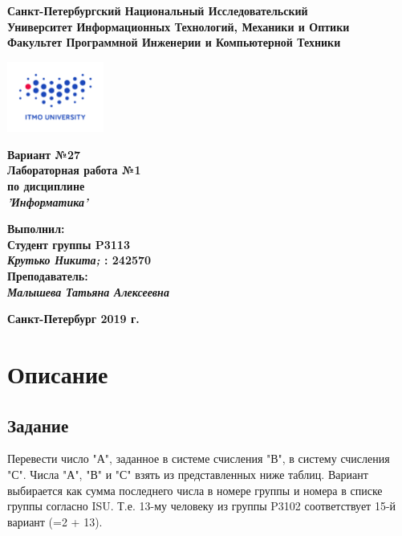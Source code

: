 \documentclass[11pt]{article}
\author{Krutko Nikita / KrutNA}
\date{\today}
\title{}
\begin{document}
\large
\thispagestyle{empty}
\begin{center}
\textbf{Санкт-Петербургский Национальный Исследовательский}\\
\textbf{Университет Информационных Технологий, Механики и Оптики}\\
\textbf{Факультет Программной Инженерии и Компьютерной Техники}\\
\end{center}
\vspace{1em}
\begin{center}
\includegraphics[width=120px]{../itmo-logo.png}
\end{center}
\LARGE
\vspace{5em}
\begin{center}
\textbf{Вариант №27}\\
\textbf{Лабораторная работа №1}\\
\Large
\textbf{по дисциплине}\\
\LARGE
\textbf{\emph{'Информатика'}}\\
\end{center}
\vspace{11em}
\large
\begin{flushright}
\textbf{Выполнил:}\\
\textbf{Студент группы P3113}\\
\textbf{\emph{Крутько Никита;} : 242570}\\
\textbf{Преподаватель:}\\
\textbf{\emph{Малышева Татьяна Алексеевна}}\\
\end{flushright}
\vspace{4em}
\large
\begin{center}
\textbf{Санкт-Петербург 2019 г.}
\end{center}
\pagebreak{}
\setcounter{tocdepth}{2}
\tableofcontents
\pagebreak{}
\section{Описание}
\label{sec:org5c5aad7}
\subsection{Задание}
\label{sec:org0e616a7}
Перевести число "А", заданное в системе счисления "В", в систему счисления "С". Числа "А", "В" и "С" взять из представленных ниже таблиц. Вариант выбирается как сумма последнего числа в номере группы и номера в списке группы согласно ISU. Т.е. 13-му человеку из группы P3102 соответствует 15-й вариант (=2 + 13).
\end{document}
